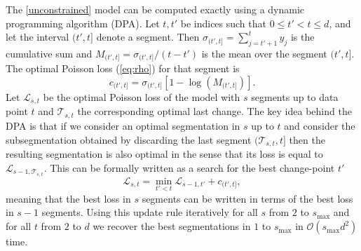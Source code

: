 \documentclass{article}
\begin{document}
The \ref{unconstrained} model can be computed exactly using a dynamic
programming algorithm (DPA).
Let $t,t'$ be indices such that $0\leq t' < t \leq d$, and let the
interval $(t', t]$ denote a segment. Then $\sigma_{(t', t]} =
\sum_{j=t'+1}^t y_j$ is the cumulative sum and $M_{(t', t]} =
\sigma_{(t', t]}/(t-t')$ is the mean over the segment $(t', t]$. The
optimal Poisson loss (\ref{eq:rho}) for that segment is
\begin{equation}
  \label{eq:log-lik-segment}
  c_{(t',t]} = \sigma_{(t', t]}\left[1 - 
  \log\left(M_{(t', t]}\right)\right].
\end{equation}
Let ${\mathcal L}_{s, t}$ be the optimal Poisson loss of the
model with $s$ segments up to data point $t$ and ${\mathcal T}_{s, t}$ the corresponding optimal last change. The key idea behind the
DPA is that 
if we consider an optimal segmentation in $s$ up to $t$ and consider
the subsegmentation obtained by discarding the last segment $({\mathcal T}_{s, t}, t]$ then
the resulting segmentation is also optimal in the sense that its loss is equal to ${\mathcal L}_{s-1, {\mathcal T}_{s, t}}.$
This can be formally written as a search for the best
change-point $t'$
\begin{equation}
{\mathcal{L}}_{s,t}= \min_{t' < t}
{\mathcal{L}}_{s-1,t'} +
 c_{(t',t]}, 
 \label{eq:update1}
\end{equation}
meaning that the best loss in $s$ segments can be written in terms of
the best loss in $s-1$ segments. Using this update
rule iteratively for all $s$ from $2$ to $s_{\text{max}}$ and for all
$t$ from $2$ to $d$ we recover the best segmentations in $1$ to
$s_{\text{max}}$ in $\mathcal{O}(s_{\text{max}}d^2)$ time.

\end{document}
